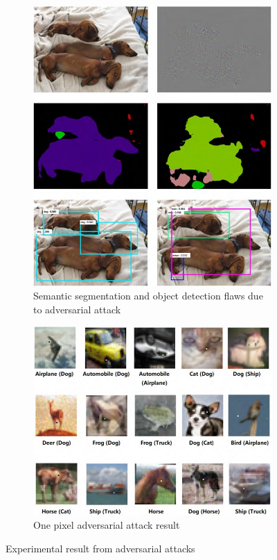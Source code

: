 \begin{figure}[H] \center
\begin{subfigure}{.5\textwidth}
  \centering
  \includegraphics[width=.8\linewidth]{./figures/story-1-2.jpg}
  \caption{Semantic segmentation and object detection flaws due to adversarial attack}
  \label{fig:segmentation-object}
\end{subfigure}%
\begin{subfigure}{.5\textwidth}
  \centering
  \includegraphics[width=.8\linewidth]{./figures/story-1-3.jpg}
  \caption{One pixel adversarial attack result}
  \label{fig:one-pixel-attack}
\end{subfigure}%
\caption{Experimental result from adversarial attacks\cite{akhtar_threat_2018}}
\label{fig:experimental-results}
\end{figure}

